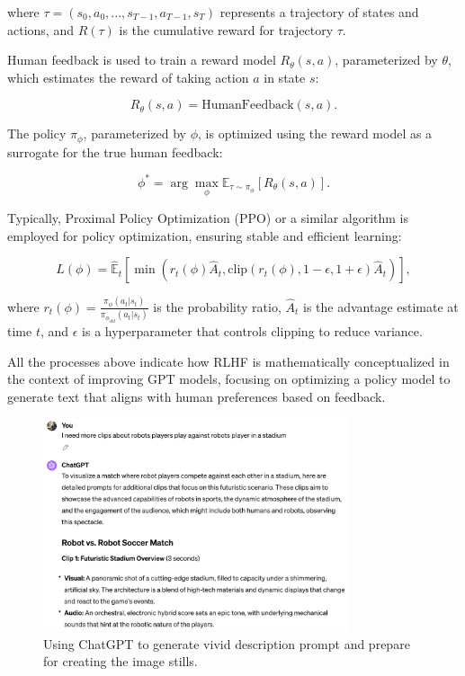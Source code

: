 \documentclass[11pt,a4paper,oneside]{report}
\begin{document}
where $\tau = (s_0, a_0, ..., s_{T-1}, a_{T-1}, s_T)$ represents a trajectory of states and actions, and $R(\tau)$ is the cumulative reward for trajectory $\tau$.

Human feedback is used to train a reward model $R_{\theta}(s,a)$, parameterized by $\theta$, which estimates the reward of taking action $a$ in state $s$:

\begin{equation}
R_{\theta}(s,a) = \text{HumanFeedback}(s, a).
\end{equation}

The policy $\pi_{\phi}$, parameterized by $\phi$, is optimized using the reward model as a surrogate for the true human feedback:

\begin{equation}
\phi^{*} = \arg\max_{\phi} \mathbb{E}_{\tau \sim \pi_{\phi}} [R_{\theta}(s,a)].
\end{equation}

Typically, Proximal Policy Optimization (PPO) or a similar algorithm is employed for policy optimization, ensuring stable and efficient learning:

\begin{equation}
L(\phi) = \hat{\mathbb{E}}_t \left[ \min(r_t(\phi) \hat{A}_t, \text{clip}(r_t(\phi), 1-\epsilon, 1+\epsilon) \hat{A}_t) \right],
\end{equation}

where $r_t(\phi) = \frac{\pi_{\phi}(a_t|s_t)}{\pi_{\phi_{old}}(a_t|s_t)}$ is the probability ratio, $\hat{A}_t$ is the advantage estimate at time $t$, and $\epsilon$ is a hyperparameter that controls clipping to reduce variance.

All the processes above indicate how RLHF is mathematically conceptualized in the context of improving GPT models, focusing on optimizing a policy model to generate text that aligns with human preferences based on feedback.

\begin{figure}[htbp]
  \centering
  \includegraphics[width=0.8\textwidth]{ChatGPT.png}
  \caption{Using ChatGPT to generate vivid description prompt and prepare for creating the image stills.}
\end{figure}
\end{document}
